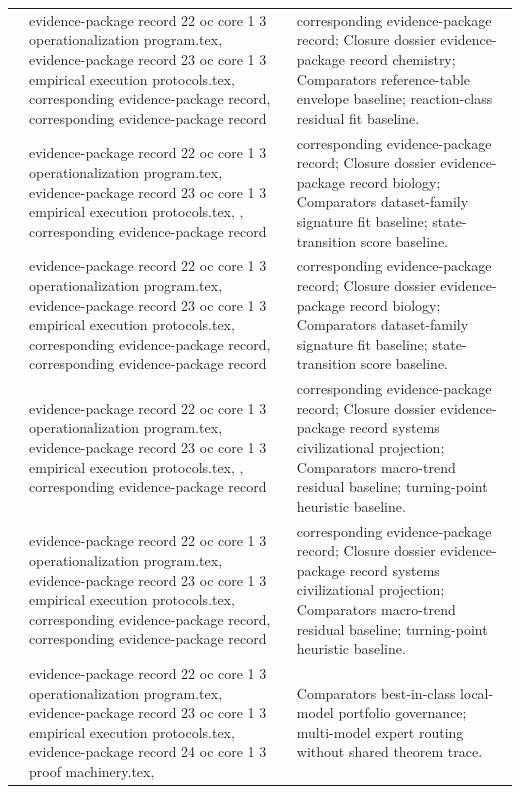 \begin{longtable}{@{}L{0.16\textwidth}L{0.38\textwidth}L{0.34\textwidth}@{}}
 & evidence-package record 22 oc core 1 3 operationalization program.tex, \allowbreak evidence-package record 23 oc core 1 3 empirical execution protocols.tex, corresponding evidence-package record, corresponding evidence-package record & corresponding evidence-package record; Closure dossier evidence-package record chemistry; Comparators reference-table envelope baseline; reaction-class residual fit baseline. \\
 & evidence-package record 22 oc core 1 3 operationalization program.tex, \allowbreak evidence-package record 23 oc core 1 3 empirical execution protocols.tex, \allowbreak {}, corresponding evidence-package record & corresponding evidence-package record; Closure dossier evidence-package record biology; Comparators dataset-family signature fit baseline; state-transition score baseline. \\
 & evidence-package record 22 oc core 1 3 operationalization program.tex, \allowbreak evidence-package record 23 oc core 1 3 empirical execution protocols.tex, corresponding evidence-package record, corresponding evidence-package record & corresponding evidence-package record; Closure dossier evidence-package record biology; Comparators dataset-family signature fit baseline; state-transition score baseline. \\
 & evidence-package record 22 oc core 1 3 operationalization program.tex, \allowbreak evidence-package record 23 oc core 1 3 empirical execution protocols.tex, \allowbreak {}, corresponding evidence-package record & corresponding evidence-package record; Closure dossier evidence-package record systems civilizational projection; Comparators macro-trend residual baseline; turning-point heuristic baseline. \\
 & evidence-package record 22 oc core 1 3 operationalization program.tex, \allowbreak evidence-package record 23 oc core 1 3 empirical execution protocols.tex, corresponding evidence-package record, corresponding evidence-package record & corresponding evidence-package record; Closure dossier evidence-package record systems civilizational projection; Comparators macro-trend residual baseline; turning-point heuristic baseline. \\
 & evidence-package record 22 oc core 1 3 operationalization program.tex, \allowbreak evidence-package record 23 oc core 1 3 empirical execution protocols.tex, \allowbreak evidence-package record 24 oc core 1 3 proof machinery.tex, \allowbreak {} & Comparators best-in-class local-model portfolio governance; multi-model expert routing without shared theorem trace. \\
\bottomrule
\end{longtable}

